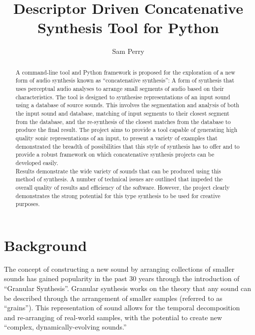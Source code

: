 \documentclass{scrartcl}
\begin{document}
    \title{Descriptor Driven Concatenative Synthesis Tool for Python}
    \author{Sam Perry}

    \maketitle

    \begin{abstract} 
    A command-line tool and Python framework is proposed for the exploration of
    a new form of audio synthesis known as ``concatenative synthesis'': A
    form of synthesis that uses perceptual audio analyses to arrange small
    segments of audio based on their characteristics.  The tool is designed to
    synthesise representations of an input sound using a database of source
    sounds. This involves the segmentation and analysis of both the input sound
    and database, matching of input segments to their closest segment from the
    database, and the re-synthesis of the closest matches from the database to
    produce the final result. The  project aims to provide a tool capable of
    generating high quality sonic representations of an input, to present a
    variety of examples that demonstrated the breadth of possibilities that
    this style of synthesis has to offer and to provide a robust framework on
    which concatenative synthesis projects can be developed easily.\\

    Results demonstrate the wide variety of sounds that can be produced using
    this method of synthesis. A number of technical issues are outlined that
    impeded the overall quality of results and efficiency of the software.
    However, the project clearly demonstrates the strong potential for this
    type synthesis to be used for creative purposes.
    \end{abstract}

    \section*{Background}
    The concept of constructing a new sound by arranging collections of smaller
    sounds has gained popularity in the past 30 years through the introduction
    of ``Granular Synthesis''. Granular synthesis works on the theory that any
    sound can be described through the arrangement of smaller samples (referred
    to as ``grains''). This representation of sound allows for the temporal
    decomposition and re-arranging of real-world samples, with the potential to
    create new ``complex, dynamically-evolving
    sounds.''~\parencite[p.1]{Roads1988}\\
\end{document}
